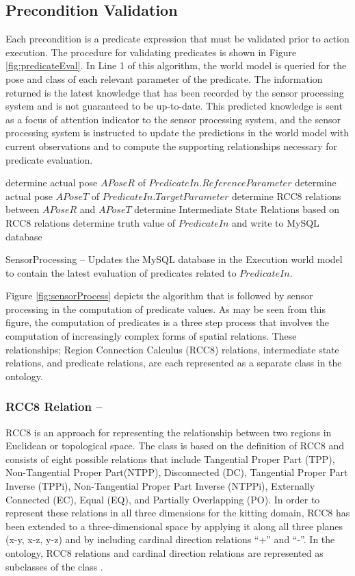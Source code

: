 \subsection{Precondition Validation}
\label{sect:preconditionValid}
Each precondition is a predicate expression that must be validated prior to
action execution.
The procedure for validating predicates is shown in Figure \ref{fig:predicateEval}. In Line 1 of this algorithm, the world
model is queried for the pose and class of each relevant 
parameter of the predicate. The information returned is the 
latest knowledge that has been recorded by the sensor processing
system and is not guaranteed to be up-to-date. This predicted
knowledge is sent as a focus of attention indicator to the sensor
processing system, and the sensor processing system is instructed to
update the predictions in the world model with current observations
and to compute the supporting relationships necessary for predicate
evaluation.
%
\begin{algorithm}[h!]
 	determine actual pose $APoseR$ of $PredicateIn.ReferenceParameter$\;
 	determine actual pose $APoseT$ of $PredicateIn.TargetParameter$\;
 	determine RCC8 relations between $APoseR$ and $APoseT$\;
 	determine Intermediate State Relations based on RCC8 relations\;
 	determine truth value of $PredicateIn$ and write to MySQL database\;
\caption{{\sc SensorProcessing} -- Updates the MySQL database in the Execution world model
to contain the latest evaluation of predicates related to $PredicateIn$.}
\label{fig:sensorProcess}
\end{algorithm}
%
Figure \ref{fig:sensorProcess} depicts the algorithm that is followed by
sensor processing in the computation of predicate values. As may be seen from this
figure, the computation of predicates is a three step process that involves
the computation of increasingly complex forms of spatial relations. These
relationships; Region Connection Calculus (RCC8) relations, intermediate state relations, and predicate relations, are each represented as a separate class in
the ontology.
%
\subsubsection{RCC8 Relation --}
RCC8 \cite{Wolter2000} is an approach for representing the relationship between two regions in Euclidean or topological space. The class  
is based on the definition of RCC8 and consists of eight possible relations that include Tangential Proper Part (TPP), Non-Tangential Proper Part(NTPP), Disconnected (DC), Tangential Proper Part Inverse (TPPi), Non-Tangential Proper Part Inverse (NTPPi), Externally Connected (EC), Equal (EQ), and Partially Overlapping (PO). In order to represent these relations in all three dimensions for the kitting domain, RCC8 has been extended to a three-dimensional space by applying it along all three planes (x-y, x-z, y-z) and by including cardinal direction relations ``+'' and ``-''. In the ontology, RCC8 relations and cardinal direction relations are represented as subclasses of the class . 
%
